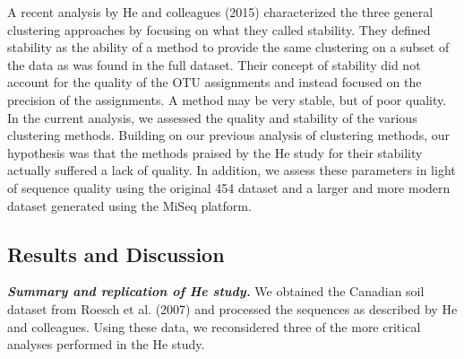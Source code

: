 \documentclass[11pt,]{article}
\begin{document}
A recent analysis by He and colleagues (2015) characterized the three
general clustering approaches by focusing on what they called stability.
They defined stability as the ability of a method to provide the same
clustering on a subset of the data as was found in the full dataset.
Their concept of stability did not account for the quality of the OTU
assignments and instead focused on the precision of the assignments. A
method may be very stable, but of poor quality. In the current analysis,
we assessed the quality and stability of the various clustering methods.
Building on our previous analysis of clustering methods, our hypothesis
was that the methods praised by the He study for their stability
actually suffered a lack of quality. In addition, we assess these
parameters in light of sequence quality using the original 454 dataset
and a larger and more modern dataset generated using the MiSeq platform.

\subsection{Results and Discussion}\label{results-and-discussion}

\textbf{\emph{Summary and replication of He study.}} We obtained the
Canadian soil dataset from Roesch et al. (2007) and processed the
sequences as described by He and colleagues. Using these data, we
reconsidered three of the more critical analyses performed in the He
study.
\end{document}
